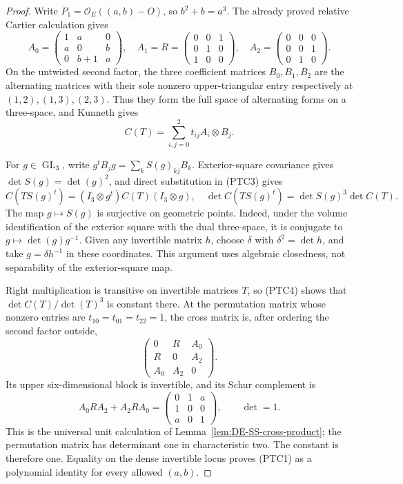 \begin{proof}
Write \(P_1=\mathcal O_E((a,b)-O)\), so \(b^2+b=a^3\).
The already proved relative Cartier calculation gives
\[
 A_0=\begin{pmatrix}1&a&0\\a&0&b\\0&b+1&a\end{pmatrix},
 \quad A_1=R=\begin{pmatrix}0&0&1\\0&1&0\\1&0&0\end{pmatrix},
 \quad A_2=\begin{pmatrix}0&0&0\\0&0&1\\0&1&0\end{pmatrix}.
 \tag{PTC2}
\]
On the untwisted second factor, the three coefficient matrices
\(B_0,B_1,B_2\) are the alternating matrices with their sole
nonzero upper-triangular entry respectively at \((1,2),(1,3),(2,3)\).
Thus they form the full space of alternating forms on a three-space,
and Kunneth gives
\[
                    C(T)=\sum_{i,j=0}^2t_{ij}A_i\otimes B_j.
 \tag{PTC3}
\]

For \(g\in\operatorname{GL}_3\), write
\(g^tB_jg=\sum_k S(g)_{kj}B_k\). Exterior-square covariance
gives \(\det S(g)=\det(g)^2\), and direct substitution in
(PTC3) gives
\[
 C(TS(g)^t)=(I_3\otimes g^t)C(T)(I_3\otimes g),
 \quad
 \det C(TS(g)^t)=\det S(g)^3\det C(T).
 \tag{PTC4}
\]
The map \(g\mapsto S(g)\) is surjective on geometric points.
Indeed, under the volume identification of the exterior square
with the dual three-space, it is conjugate to
\(g\mapsto\det(g)g^{-1}\). Given any invertible matrix \(h\),
choose \(\delta\) with \(\delta^2=\det h\), and take
\(g=\delta h^{-1}\) in these coordinates. This argument uses
algebraic closedness, not separability of the exterior-square map.

Right multiplication is transitive on invertible matrices \(T\),
so (PTC4) shows that \(\det C(T)/\det(T)^3\) is constant
there. At the permutation matrix whose nonzero entries are
\(t_{10}=t_{01}=t_{22}=1\), the cross matrix is, after ordering
the second factor outside,
\[
 \begin{pmatrix}0&R&A_0\\R&0&A_2\\A_0&A_2&0\end{pmatrix}.
\]
Its upper six-dimensional block is invertible, and its Schur
complement is
\[
 A_0RA_2+A_2RA_0
 =\begin{pmatrix}0&1&a\\1&0&0\\a&0&1\end{pmatrix},
 \qquad\det=1.
\]
This is the universal unit calculation of
Lemma~\ref{lem:DE-SS-cross-product}; the permutation matrix has
determinant one in characteristic two. The constant is therefore
one. Equality on the dense invertible locus proves (PTC1) as a
polynomial identity for every allowed \((a,b)\).
\end{proof}

